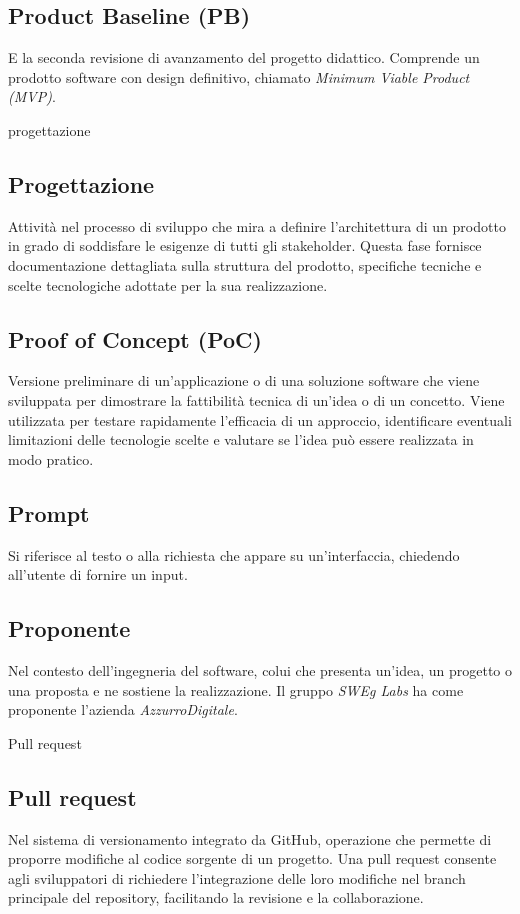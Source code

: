 \hypertarget{sec:PB}{}
\subsection*{Product Baseline (PB)}
E la seconda revisione di avanzamento del progetto didattico. Comprende un prodotto software con design definitivo, 
chiamato \emph{Minimum Viable Product (MVP)}.

\hypertarget{sec:progettazione}{progettazione}
\subsection*{Progettazione}
Attività nel processo di sviluppo che mira a definire l'architettura di un prodotto in grado di soddisfare le esigenze di tutti gli stakeholder. 
Questa fase fornisce documentazione dettagliata sulla struttura del prodotto, specifiche tecniche e scelte tecnologiche adottate per la sua realizzazione.

\hypertarget{sec:PoC}{}
\subsection*{Proof of Concept (PoC)}
Versione preliminare di un’applicazione o di una soluzione software che viene sviluppata per dimostrare la fattibilità tecnica di un’idea o di un concetto. 
Viene utilizzata per testare rapidamente l’efficacia di un approccio, identificare eventuali limitazioni delle tecnologie scelte e valutare se l’idea può 
essere realizzata in modo pratico.

\hypertarget{sec:Prompt}{}
\subsection*{Prompt}
Si riferisce al testo o alla richiesta che appare su un'interfaccia, chiedendo all'utente di fornire un input. 

\hypertarget{sec:proponente}{}
\subsection*{Proponente}
Nel contesto dell’ingegneria del software, colui che presenta un’idea, un progetto o una proposta e ne sostiene la realizzazione. Il gruppo \emph{SWEg Labs} 
ha come proponente l’azienda \emph{AzzurroDigitale}.

\hypertarget{sec:pull_request}{Pull request}
\subsection*{Pull request}
Nel sistema di versionamento integrato da GitHub, operazione che permette di proporre modifiche al codice sorgente di un progetto. 
Una pull request consente agli sviluppatori di richiedere l’integrazione delle loro modifiche nel branch principale del repository, 
facilitando la revisione e la collaborazione.

